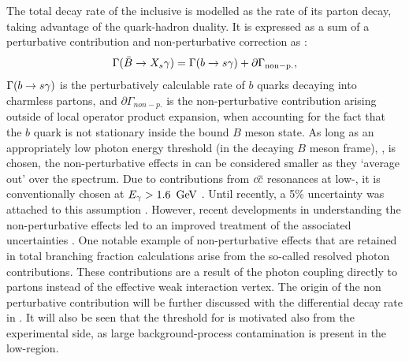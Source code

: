 The total decay rate of the inclusive \BtoXsgamma is modelled as the rate of its parton decay, taking advantage of the quark-hadron duality.
It is expressed as a sum of a perturbative contribution and non-perturbative correction as \cite{Misiak:2015xwa}:
\begin{equation}\label{eq:btosgammarate_nonp}
    \Gamma(\bar{B}\rightarrow X_s\gamma) = \Gamma(b\rightarrow s\gamma) + \partial\Gamma_{\mathrm{non-p.}},
\end{equation}
$\Gamma(b\rightarrow s\gamma)$ is the perturbatively calculable rate of $b$ quarks decaying into charmless partons, 
and $\partial\Gamma_{non-p.}$ is the non-perturbative contribution arising outside of local operator product expansion, when accounting for the fact that the $b$ quark is not stationary inside the bound $B$ meson state.
As long as an appropriately low photon energy threshold (in the decaying $B$ meson frame), \EB, is chosen, the non-perturbative effects in  can be considered smaller as they `average out' over the spectrum.
Due to contributions from $c\overline c$ resonances at low-\Egamma, it is conventionally chosen at ${E_{\gamma}}>1.6~\mathrm{\,Ge\kern -0.1em V}$ \cite{Misiak:2009nr}.
Until recently, a 5\% uncertainty was attached to this assumption \cite{Benzke:2010js}. 
However, recent developments in understanding the non-perturbative effects \cite{Gunawardana:2019gep} led to an improved treatment of the associated uncertainties \cite{Misiak:2020vlo}.
One notable example of non-perturbative effects that are retained in total branching fraction calculations arise from the so-called resolved photon contributions.
These contributions are a result of the photon coupling directly to partons instead of the effective weak interaction vertex.
The origin of the non perturbative contribution will be further discussed with the differential decay rate in .
It will also be seen that the threshold for \EB is motivated also from the experimental side, as large background-process contamination is present in the low-\EB region.

